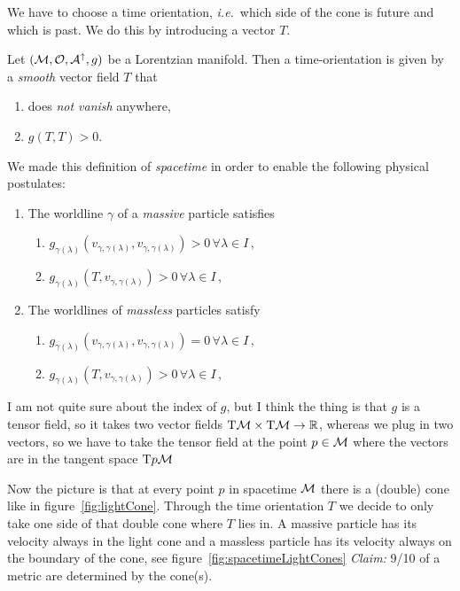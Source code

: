 We have to choose a time orientation, \textit{i.e.}\ which side of the cone is
future and which is past.
We do this by introducing a vector $T$.
\begin{defn}
    Let $(\mathcal{M}, \mathcal{O}, \mathcal{A}^\uparrow, g)$ be a Lorentzian manifold.
    Then a time-orientation is given by a \textit{smooth} vector field $T$ that
    \begin{enumerate}
        \item does \textit{not vanish} anywhere,
        \item $g(T,T)>0$.
    \end{enumerate}
\end{defn}
We made this definition of \textit{spacetime} in order to enable the
following physical postulates:
\begin{enumerate}[label=(\subscript{P}{{\arabic*}})]
    \item The worldline $\gamma$ of a \textit{massive} particle satisfies
        \begin{enumerate}
            \item $g_{\gamma(\lambda)} \left( v_{\gamma,\gamma(\lambda)}, v_{\gamma,\gamma(\lambda)} \right) > 0\,\forall \lambda\in I$\,,
            \item $g_{\gamma(\lambda)} \left(T, v_{\gamma,\gamma(\lambda)} \right) > 0\,\forall \lambda\in I$\,,
        \end{enumerate}
        \label{item:massive}
    \item The worldlines of \textit{massless} particles satisfy 
        \begin{enumerate}
            \item $g_{\gamma(\lambda)} \left( v_{\gamma,\gamma(\lambda)}, v_{\gamma,\gamma(\lambda)} \right) = 0\,\forall \lambda\in I$\,,
            \item $g_{\gamma(\lambda)} \left(T, v_{\gamma,\gamma(\lambda)} \right) > 0\,\forall \lambda\in I$\,,
        \end{enumerate}
        \label{item:massless}
\end{enumerate}
I am not quite sure about the index of $g$, but I think the thing is that $g$ is a tensor field,
so it takes two vector fields  $\T\M\times\T\M\to\mathbb{R}$,
whereas we plug in two vectors, so we have to take the tensor field at the point $p\in\mathcal{M}$ 
where the vectors are in the tangent space $\T{p}\M$

Now the picture is that at every point $p$ in spacetime $\mathcal{M}$ there is a (double) cone
like in figure~\ref{fig:lightCone}.
Through the time orientation $T$ we decide to only take one side of that double
cone where $T$ lies in.
A massive particle has its velocity always in the light cone and a massless particle has its
velocity always on the boundary of the cone, see figure~\ref{fig:spacetimeLightCones}
\textit{Claim:} 9/10 of a metric are determined by the cone(s).

